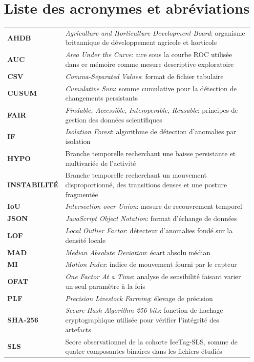 \chapter*{Liste des acronymes et abréviations}

\begin{longtable}{@{}lp{11cm}@{}}
\textbf{AHDB} & \textit{Agriculture and Horticulture Development Board}: organisme britannique de développement agricole et horticole \\[3pt]
\textbf{AUC} & \textit{Area Under the Curve}: aire sous la courbe ROC utilisée dans ce mémoire comme mesure descriptive exploratoire \\[3pt]
\textbf{CSV} & \textit{Comma-Separated Values}: format de fichier tabulaire \\[3pt]
\textbf{CUSUM} & \textit{Cumulative Sum}: somme cumulative pour la détection de changements persistants \\[3pt]
\textbf{FAIR} & \textit{Findable, Accessible, Interoperable, Reusable}: principes de gestion des données scientifiques \\[3pt]
\textbf{IF} & \textit{Isolation Forest}: algorithme de détection d'anomalies par isolation \\[3pt]
\textbf{HYPO} & Branche temporelle recherchant une baisse persistante et multivariée de l'activité \\[3pt]
\textbf{INSTABILITÉ} & Branche temporelle recherchant un mouvement disproportionné, des transitions denses et une posture fragmentée \\[3pt]
\textbf{IoU} & \textit{Intersection over Union}: mesure de recouvrement temporel \\[3pt]
\textbf{JSON} & \textit{JavaScript Object Notation}: format d'échange de données \\[3pt]
\textbf{LOF} & \textit{Local Outlier Factor}: détecteur d'anomalies fondé sur la densité locale \\[3pt]
\textbf{MAD} & \textit{Median Absolute Deviation}: écart absolu médian \\[3pt]
\textbf{MI} & \textit{Motion Index}: indice de mouvement fourni par le capteur \\[3pt]
\textbf{OFAT} & \textit{One Factor At a Time}: analyse de sensibilité faisant varier un seul paramètre à la fois \\[3pt]
\textbf{PLF} & \textit{Precision Livestock Farming}: élevage de précision \\[3pt]
\textbf{SHA-256} & \textit{Secure Hash Algorithm 256 bits}: fonction de hachage cryptographique utilisée pour vérifier l'intégrité des artefacts \\[3pt]
\textbf{SLS} & Score observationnel de la cohorte IceTag-SLS, somme de quatre composantes binaires dans les fichiers étudiés \\[3pt]
\end{longtable}

